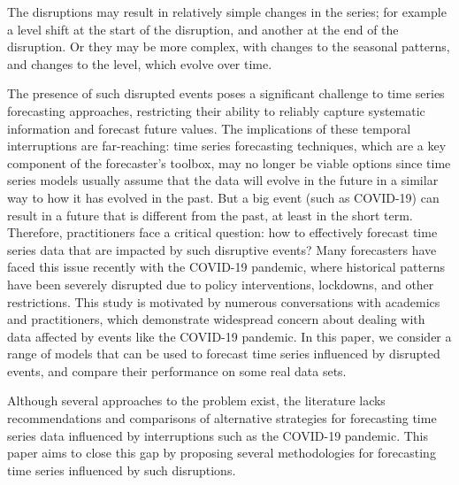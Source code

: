 \documentclass[
  11pt,
  a4paper,
]{article}
\begin{document}
The disruptions may result in relatively simple changes in the series;
for example a level shift at the start of the disruption, and another at
the end of the disruption. Or they may be more complex, with changes to
the seasonal patterns, and changes to the level, which evolve over time.

The presence of such disrupted events poses a significant challenge to
time series forecasting approaches, restricting their ability to
reliably capture systematic information and forecast future values. The
implications of these temporal interruptions are far-reaching: time
series forecasting techniques, which are a key component of the
forecaster's toolbox, may no longer be viable options since time series
models usually assume that the data will evolve in the future in a
similar way to how it has evolved in the past. But a big event (such as
COVID-19) can result in a future that is different from the past, at
least in the short term. Therefore, practitioners face a critical
question: how to effectively forecast time series data that are impacted
by such disruptive events? Many forecasters have faced this issue
recently with the COVID-19 pandemic, where historical patterns have been
severely disrupted due to policy interventions, lockdowns, and other
restrictions. This study is motivated by numerous conversations with
academics and practitioners, which demonstrate widespread concern about
dealing with data affected by events like the COVID-19 pandemic. In this
paper, we consider a range of models that can be used to forecast time
series influenced by disrupted events, and compare their performance on
some real data sets.

Although several approaches to the problem exist, the literature lacks
recommendations and comparisons of alternative strategies for
forecasting time series data influenced by interruptions such as the
COVID-19 pandemic. This paper aims to close this gap by proposing
several methodologies for forecasting time series influenced by such
disruptions.
\end{document}
